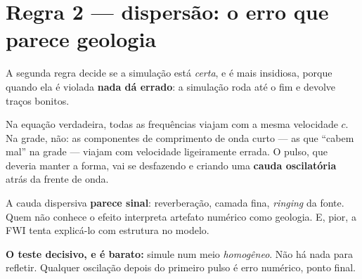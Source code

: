 \documentclass[11pt,a4paper,oneside]{report}
\begin{document}
\section{Regra 2 --- dispers\~ao: o erro que parece geologia}

A segunda regra decide se a simula\c{c}\~ao est\'a \emph{certa}, e \'e mais
insidiosa, porque quando ela \'e violada \textbf{nada d\'a errado}: a
simula\c{c}\~ao roda at\'e o fim e devolve tra\c{c}os bonitos.

Na equa\c{c}\~ao verdadeira, todas as frequ\^encias viajam com a mesma
velocidade $c$. Na grade, n\~ao: as componentes de comprimento de onda curto
--- as que ``cabem mal'' na grade --- viajam com velocidade ligeiramente
errada. O pulso, que deveria manter a forma, vai se desfazendo e criando uma
\textbf{cauda oscilat\'oria} atr\'as da frente de onda.

\begin{center}
\end{center}

\begin{armadilha}
A cauda dispersiva \textbf{parece sinal}: reverbera\c{c}\~ao, camada fina,
\emph{ringing} da fonte. Quem n\~ao conhece o efeito interpreta artefato
num\'erico como geologia. E, pior, a FWI tenta explic\'a-lo com estrutura no
modelo.

\textbf{O teste decisivo, e \'e barato:} simule num meio \emph{homog\^eneo}.
N\~ao h\'a nada para refletir. Qualquer oscila\c{c}\~ao depois do primeiro
pulso \'e erro num\'erico, ponto final.
\end{armadilha}
\end{document}
